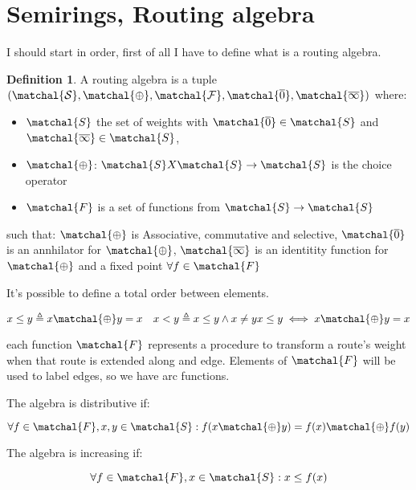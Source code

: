 \documentclass[10pt,conference,letterpaper]{IEEEtran}
\theoremstyle{definition}
\newtheorem{definition}{Definition}
\theoremstyle{remark}
\newcommand{\semiringset}{\ensuremath{\matchal{S}}\xspace}
\newcommand{\semiringchoice}{\ensuremath{\matchal{\oplus}}\xspace}
\newcommand{\semiringfunctions}{\ensuremath{\matchal{F}}\xspace}
\newcommand{\semiringempty}{\ensuremath{\matchal{\overline{\rm 0}}}\xspace}
\newcommand{\semiringinvalid}{\ensuremath{\matchal{\overline{\rm \infty}}}\xspace}
\newcommand{\semiring}{\ensuremath{\mathcal{(\semiringset, \semiringchoice, \semiringfunctions, \semiringempty, \semiringinvalid)}}\xspace}
\begin{document}
\section{Semirings, Routing algebra}
\label{sec:routing_algebra}

I should start in order, first of all I have to define what is a routing algebra.

\theoremstyle{definition}
\begin{definition}
	A routing algebra is a tuple \semiring where:
	\begin{itemize}
			\item \semiringset the set of weights with $\semiringempty \in \semiringset$
				and $\semiringinvalid \in \semiringset$,
			\item \semiringchoice: $\semiringset X \semiringset \to \semiringset$
				is the choice operator
			\item \semiringfunctions is a set of functions from $\semiringset \to \semiringset$
	\end{itemize}
	such that:
	\semiringchoice is Associative, commutative and selective, \semiringempty is
	an annhilator for \semiringchoice, \semiringinvalid is an identitity function for
	\semiringchoice and a fixed point $\forall f \in \semiringfunctions$
\end{definition}

It's possible to define a total order between elements.

\begin{equation}
	x \leq y \triangleq x \semiringchoice y = x \quad
	x < y \triangleq x \leq y \land x \neq y

	x \leq y \iff x \semiringchoice y = x
\end{equation}

each function \semiringfunctions represents a procedure to transform a route's
weight when that route is extended along and edge.
Elements of \semiringfunctions will be used to label edges, so we have
arc functions.

The algebra is distributive if:

\begin{equation}
	\forall f \in \semiringfunctions, x,y \in \semiringset: f(x \semiringchoice y) = f(x) \semiringchoice f(y) 
\end{equation}

The algebra is increasing if:

\begin{equation}
	\forall f \in \semiringfunctions, x \in \semiringset: x \leq f(x)
\end{equation}
\end{document}

